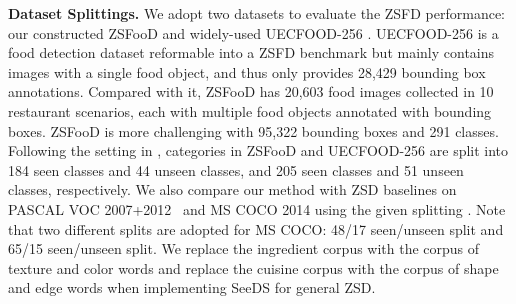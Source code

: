 \noindent\textbf{Dataset Splittings.}
We adopt two datasets to evaluate the ZSFD performance: our constructed ZSFooD and widely-used UECFOOD-256 \cite{kawano14c}. UECFOOD-256 is a food detection dataset reformable into a ZSFD benchmark but mainly contains images with a single food object, and thus only provides 28,429 bounding box annotations. Compared with it, ZSFooD has 20,603 food images collected in 10 restaurant scenarios, each with multiple food objects annotated with bounding boxes. ZSFooD is more challenging with 95,322 bounding boxes and 291 classes. 
Following the setting in \cite{bansal2018zero, rahman2018polarity}, categories in ZSFooD and UECFOOD-256 are split into 184 seen classes and 44 unseen classes, and 205 seen classes and 51 unseen classes, respectively. We also compare our method with ZSD baselines on PASCAL VOC 2007+2012~\cite{everingham2010pascal} and MS COCO 2014 \cite{coco} using the given splitting \cite{hayat2020synthesizing, huang2022robust}. Note that two different splits are adopted for MS COCO: 48/17 seen/unseen split and 65/15 seen/unseen split. We replace the ingredient corpus with the corpus of texture and color words and replace the cuisine corpus with the corpus of shape and edge words when implementing SeeDS for general ZSD.

\begin{table}[!t]
  \centering
  \renewcommand{\arraystretch}{0.75}
  \caption{Comparison with baselines on UECFOOD-256 (\%).}
  \label{tab:UEC256}\end{table}

